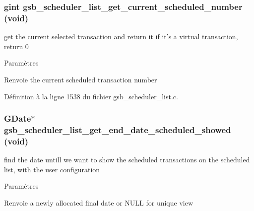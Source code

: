 \subsubsection[{gsb\_\-scheduler\_\-list\_\-get\_\-current\_\-scheduled\_\-number}]{\setlength{\rightskip}{0pt plus 5cm}gint gsb\_\-scheduler\_\-list\_\-get\_\-current\_\-scheduled\_\-number (void)}\label{gsb__scheduler__list_8c_a52c8fea240a34ec37da7fe33460d06e7}
get the current selected transaction and return it if it's a virtual transaction, return 0


\begin{DoxyParams}{Paramètres}
\item[{\em }]\end{DoxyParams}
\begin{DoxyReturn}{Renvoie}
the current scheduled transaction number 
\end{DoxyReturn}


Définition à la ligne 1538 du fichier gsb\_\-scheduler\_\-list.c.

\subsubsection[{gsb\_\-scheduler\_\-list\_\-get\_\-end\_\-date\_\-scheduled\_\-showed}]{\setlength{\rightskip}{0pt plus 5cm}GDate$\ast$ gsb\_\-scheduler\_\-list\_\-get\_\-end\_\-date\_\-scheduled\_\-showed (void)}\label{gsb__scheduler__list_8c_ad9e65bbbb35121bbbb743a902b3632e9}
find the date untill we want to show the scheduled transactions on the scheduled list, with the user configuration


\begin{DoxyParams}{Paramètres}
\item[{\em }]\end{DoxyParams}
\begin{DoxyReturn}{Renvoie}
a newly allocated final date or NULL for unique view 
\end{DoxyReturn}


